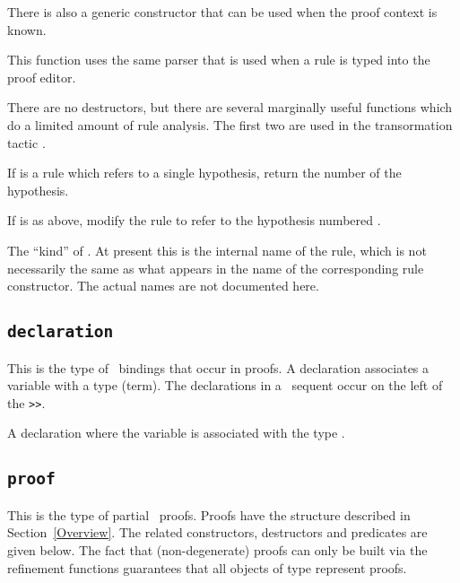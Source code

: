 There is also a generic constructor that can be used when the 
proof context is known.

This function uses the same
parser that is used when a rule is typed into the proof editor.  

\smallskip

There are no destructors, but there are several marginally useful functions
which do a limited amount of rule analysis.  The first two are used in the
transormation tactic .

  If  is a rule which refers to
a single hypothesis, return the number of the hypothesis.

  If  is as above, modify
the rule to refer to the hypothesis numbered .

 The ``kind'' of .  At present
this is the internal name of the rule, which is not necessarily the same as
what appears in the name of the corresponding rule constructor.  The actual
names are not documented here.


\subsection*{\tt declaration}

This is the type of \prl\ bindings that occur in proofs.  A declaration
associates a variable with a type (term).  The declarations in a \prl\
sequent occur on the left of the {\tt >>}.


A declaration where the
variable  is associated with the type .




\subsection*{\tt proof}

This is the type of partial \nuprl\ proofs.  Proofs have the structure
described in Section~\ref{Overview}.  The related constructors, destructors
and predicates are given below.  The fact that (non-degenerate) proofs can
only be built via the refinement functions guarantees that all objects of
type \tid{proof} represent proofs.

